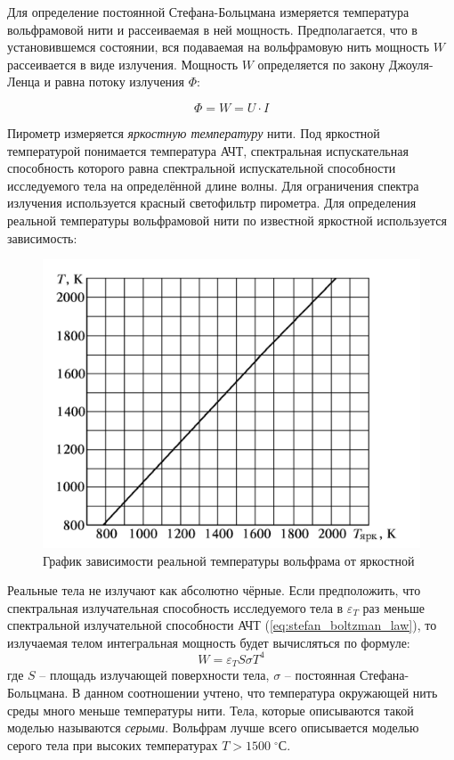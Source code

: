 \documentclass[a4paper, 12pt]{article}
\newcommand{\cels}{\; ^\circ С}
\begin{document}
    Для определение постоянной Стефана-Больцмана измеряется температура вольфрамовой нити и рассеиваемая в ней мощность. Предполагается, что в установившемся состоянии, вся подаваемая на вольфрамовую нить мощность $W$ рассеивается в виде излучения. Мощность $W$ определяется по закону Джоуля-Ленца и равна потоку излучения $\Phi$:
    
    $$
    \Phi = W = U \cdot I
    $$

    Пирометр измеряется \textit{яркостную температуру} нити. Под яркостной температурой понимается температура АЧТ, спектральная испускательная способность которого равна спектральной испускательной способности исследуемого тела на определённой длине волны. Для ограничения спектра излучения используется красный светофильтр пирометра. Для определения реальной температуры вольфрамовой нити по известной яркостной используется зависимость:
	
    \begin{figure}[H]
        \centering
        \includegraphics[width = 14 cm]{images/wolfram_real_temp_brigh_temp.png}
        \caption{График зависимости реальной температуры вольфрама от яркостной}
        \label{img:wolfram_real_temp_brigh_temp}
    \end{figure}
	
    Реальные тела не излучают как абсолютно чёрные. Если предположить, что спектральная излучательная способность исследуемого тела в $\varepsilon_T$ раз меньше спектральной излучательной способности АЧТ (\ref{eq:stefan_boltzman_law}), то излучаемая телом интегральная мощность будет вычисляться по формуле:
    \begin{equation}
        W = \varepsilon_T S \sigma T^4
        \label{eq:grey_stefan_boltzmann}
    \end{equation}
    где $S$ -- площадь излучающей поверхности тела, $\sigma$ -- постоянная Стефана-Больцмана. В данном соотношении учтено, что температура окружающей нить среды много меньше температуры нити. Тела, которые описываются такой моделью называются \textit{серыми}. Вольфрам лучше всего описывается моделью серого тела при высоких температурах $T > 1500 \cels$. 
	
\end{document}

